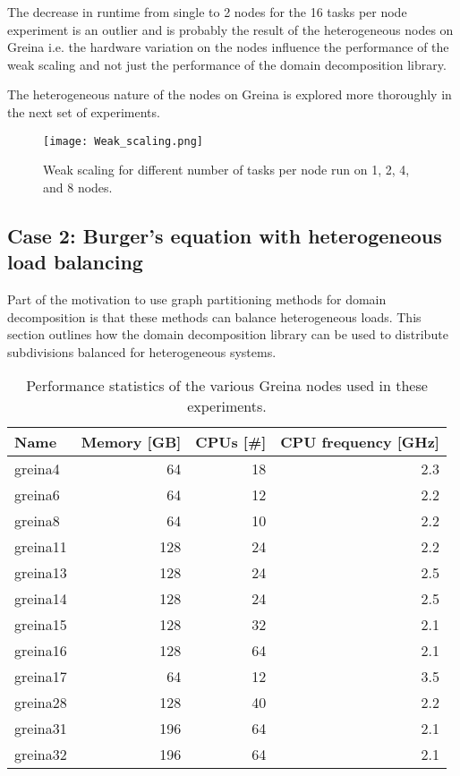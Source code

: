 The decrease in runtime from single to 2 nodes for the 16 tasks per node experiment is an outlier and is probably the result of the heterogeneous nodes on Greina i.e. the hardware variation on the nodes influence the performance of the weak scaling and not just the performance of the domain decomposition library.

The heterogeneous nature of the nodes on Greina is explored more thoroughly in the next set of experiments.

\begin{figure}[!htbp]
\centering
\texttt{[image: Weak\_scaling.png]}
\caption{Weak scaling for different number of tasks per node run on 1, 2, 4, and 8 nodes.}
\label{fig:burgers_weakscaling}
\end{figure}

\newpage
\subsection{Case 2: Burger's equation with heterogeneous load balancing}
Part of the motivation to use graph partitioning methods for domain decomposition is that these methods can balance heterogeneous loads.
This section outlines how the domain decomposition library can be used to distribute subdivisions balanced for heterogeneous systems.

\begin{table}[!htbp]
\centering
{}
\begin{tabular}{l r r r}
\toprule
Name & Memory [GB] & CPUs [\#] & CPU frequency [GHz] \\
\midrule
greina4 & 64 & 18 & 2.3 \\
greina6 & 64 & 12 & 2.2 \\
greina8 & 64 & 10 & 2.2 \\
greina11 & 128 & 24 & 2.2 \\
greina13 & 128 & 24 & 2.5 \\
greina14 & 128 & 24 & 2.5 \\
greina15 & 128 & 32 & 2.1 \\
greina16 & 128 & 64 & 2.1 \\
greina17 & 64 & 12 & 3.5 \\
greina28 & 128 & 40 & 2.2 \\
greina31 & 196 & 64 & 2.1 \\
greina32 & 196 & 64 & 2.1 \\
\bottomrule
\end{tabular}
\caption{Performance statistics of the various Greina nodes used in these experiments.}
\label{tab:greina_nodes}
\end{table}

